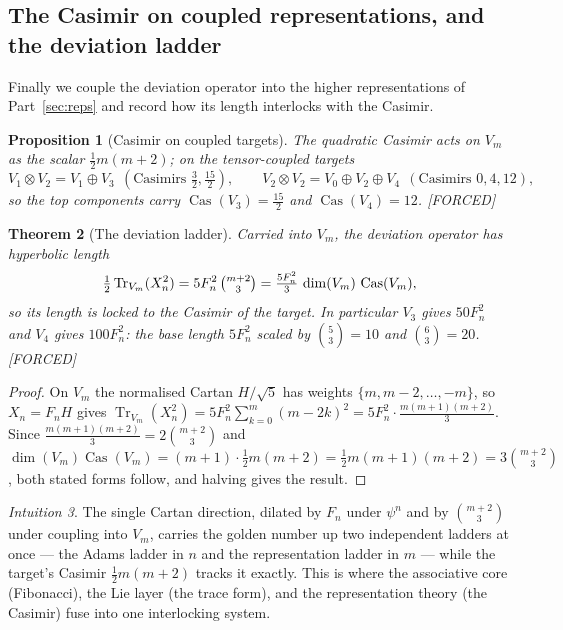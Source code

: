 \documentclass[11pt]{article}
\theoremstyle{plain}
\newtheorem{theorem}{Theorem}[section]
\newtheorem{proposition}[theorem]{Proposition}
\theoremstyle{definition}
\theoremstyle{remark}
\newtheorem{intuition}[theorem]{Intuition}
\newcommand{\Forced}{\textcolor{forcedc}{[FORCED]}}
\newcommand{\Tr}{\operatorname{Tr}}
\begin{document}
\subsection{The Casimir on coupled representations, and the deviation ladder}

Finally we couple the deviation operator into the higher representations of Part~\ref{sec:reps} and record how its length interlocks with the Casimir.

\begin{proposition}[Casimir on coupled targets]\label{prop:casimir-coupled}
The quadratic Casimir acts on $V_m$ as the scalar $\tfrac12 m(m+2)$; on the tensor-coupled targets
\[
V_1⊗V_2=V_1⊕V_3\ \ (\text{Casimirs }\tfrac32,\tfrac{15}{2}),\qquad
V_2⊗V_2=V_0⊕V_2⊕V_4\ \ (\text{Casimirs }0,4,12),
\]
so the top components carry $\operatorname{Cas}(V_3)=\tfrac{15}{2}$ and $\operatorname{Cas}(V_4)=12$. \Forced
\end{proposition}

\begin{theorem}[The deviation ladder]\label{thm:ladder}
Carried into $V_m$, the deviation operator has hyperbolic length
\[
\tfrac12\Tr_{V_m}(X_n^{2})=5F_n^{2}\,\tbinom{m+2}{3}=\tfrac{5F_n^{2}}{3}\,\dim(V_m)\,\operatorname{Cas}(V_m),
\]
so its length is locked to the Casimir of the target. In particular $V_3$ gives $50F_n^{2}$ and $V_4$ gives $100F_n^{2}$: the base length $5F_n^{2}$ scaled by $\binom{5}{3}=10$ and $\binom{6}{3}=20$. \Forced
\end{theorem}
\begin{proof}
On $V_m$ the normalised Cartan $H/\sqrt5$ has weights $\{m,m-2,\dots,-m\}$, so $X_n=F_nH$ gives $\Tr_{V_m}(X_n^{2})=5F_n^{2}\sum_{k=0}^{m}(m-2k)^{2}=5F_n^{2}\cdot\tfrac{m(m+1)(m+2)}{3}$. Since $\tfrac{m(m+1)(m+2)}{3}=2\binom{m+2}{3}$ and $\dim(V_m)\operatorname{Cas}(V_m)=(m+1)\cdot\tfrac12 m(m+2)=\tfrac12 m(m+1)(m+2)=3\binom{m+2}{3}$, both stated forms follow, and halving gives the result.
\end{proof}

\begin{intuition}
The single Cartan direction, dilated by $F_n$ under $ψ^{n}$ and by $\binom{m+2}{3}$ under coupling into $V_m$, carries the golden number up two independent ladders at once --- the Adams ladder in $n$ and the representation ladder in $m$ --- while the target's Casimir $\tfrac12 m(m+2)$ tracks it exactly. This is where the associative core (Fibonacci), the Lie layer (the trace form), and the representation theory (the Casimir) fuse into one interlocking system.
\end{intuition}
\end{document}
